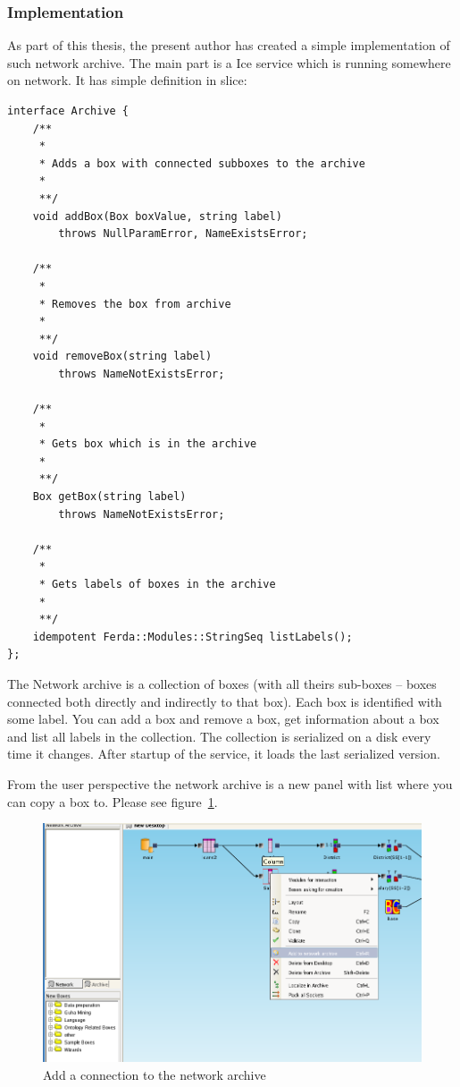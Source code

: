 \documentclass[a4paper,12pt]{book}
\begin{document}
\subsubsection{Implementation}
As part of this thesis, the present author has created a simple implementation of such network archive. The main part is a Ice service which is running somewhere on network. It has simple definition in slice:
\begin{verbatim}
interface Archive {
	/**
	 *
	 * Adds a box with connected subboxes to the archive
	 *
	 **/
	void addBox(Box boxValue, string label)
		throws NullParamError, NameExistsError;

	/**
	 *
	 * Removes the box from archive
	 *
	 **/
	void removeBox(string label)
		throws NameNotExistsError;

	/**
	 *
	 * Gets box which is in the archive
	 *
	 **/
	Box getBox(string label)
		throws NameNotExistsError;

	/**
	 *
	 * Gets labels of boxes in the archive
	 *
	 **/
	idempotent Ferda::Modules::StringSeq listLabels();
};
\end{verbatim}

The Network archive is a collection of boxes (with all theirs sub-boxes -- boxes connected both directly and indirectly to that box). Each box is identified with some label. You can add a box and remove a box, get information about a box and list all labels in the collection. The collection is serialized on a disk every time it changes. After startup of the service, it loads the last serialized version.

From the user perspective the network archive is a new panel with list where you can copy a box to. Please see figure~\ref{fig:addToNA}. 
\begin{figure}
	\includegraphics[width=1\textwidth]{add_to_network_archive}
	\caption{Add a connection to the network archive}
	\label{fig:addToNA}
\end{figure}
\end{document}

